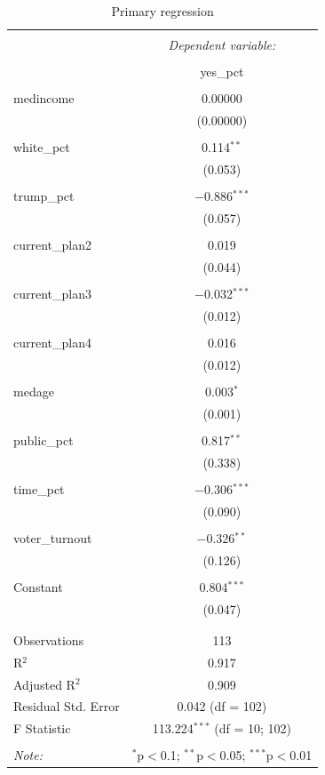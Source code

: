 \documentclass[
]{article}
\begin{document}
\begin{table}[!htbp] \centering 
  \caption{Primary regression} 
  \label{Primary} 
\begin{tabular}{@{\extracolsep{5pt}}lc} 
\\[-1.8ex]\hline 
\hline \\[-1.8ex] 
 & \multicolumn{1}{c}{\textit{Dependent variable:}} \\ 
\cline{2-2} 
\\[-1.8ex] & yes\_pct \\ 
\hline \\[-1.8ex] 
 medincome & 0.00000 \\ 
  & (0.00000) \\ 
  & \\ 
 white\_pct & 0.114$^{**}$ \\ 
  & (0.053) \\ 
  & \\ 
 trump\_pct & $-$0.886$^{***}$ \\ 
  & (0.057) \\ 
  & \\ 
 current\_plan2 & 0.019 \\ 
  & (0.044) \\ 
  & \\ 
 current\_plan3 & $-$0.032$^{***}$ \\ 
  & (0.012) \\ 
  & \\ 
 current\_plan4 & 0.016 \\ 
  & (0.012) \\ 
  & \\ 
 medage & 0.003$^{*}$ \\ 
  & (0.001) \\ 
  & \\ 
 public\_pct & 0.817$^{**}$ \\ 
  & (0.338) \\ 
  & \\ 
 time\_pct & $-$0.306$^{***}$ \\ 
  & (0.090) \\ 
  & \\ 
 voter\_turnout & $-$0.326$^{**}$ \\ 
  & (0.126) \\ 
  & \\ 
 Constant & 0.804$^{***}$ \\ 
  & (0.047) \\ 
  & \\ 
\hline \\[-1.8ex] 
Observations & 113 \\ 
R$^{2}$ & 0.917 \\ 
Adjusted R$^{2}$ & 0.909 \\ 
Residual Std. Error & 0.042 (df = 102) \\ 
F Statistic & 113.224$^{***}$ (df = 10; 102) \\ 
\hline 
\hline \\[-1.8ex] 
\textit{Note:}  & \multicolumn{1}{l}{$^{*}$p$<$0.1; $^{**}$p$<$0.05; $^{***}$p$<$0.01} \\ 
\end{tabular} 
\end{table}
\end{document}
